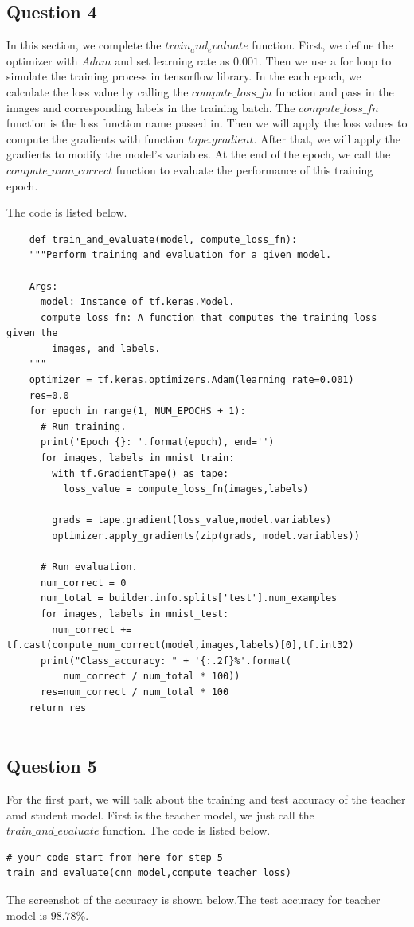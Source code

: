 \documentclass[conference]{IEEEtran}
\begin{document}
\subsection{Question 4}
In this section, we complete the $train_and_evaluate$ function.
First, we define the optimizer with $Adam$ and set learning rate as $0.001$.
Then we use a for loop to simulate the training process in tensorflow library.
In the each epoch, we calculate the loss value by calling the $compute\_loss\_fn$ function and pass in the images and corresponding labels in the training batch.
The $compute\_loss\_fn$ function is the loss function name passed in.
Then we will apply the loss values to compute the gradients with function $tape.gradient$. 
After that, we will apply the gradients to modify the model's variables.
At the end of the epoch, we call the $compute\_num\_correct$ function to evaluate the performance of this training epoch.\par
The code is listed below.
\begin{lstlisting}
    def train_and_evaluate(model, compute_loss_fn):
    """Perform training and evaluation for a given model.
  
    Args:
      model: Instance of tf.keras.Model.
      compute_loss_fn: A function that computes the training loss given the
        images, and labels.
    """
    optimizer = tf.keras.optimizers.Adam(learning_rate=0.001)
    res=0.0
    for epoch in range(1, NUM_EPOCHS + 1):
      # Run training.
      print('Epoch {}: '.format(epoch), end='')
      for images, labels in mnist_train:
        with tf.GradientTape() as tape:
          loss_value = compute_loss_fn(images,labels)
  
        grads = tape.gradient(loss_value,model.variables)
        optimizer.apply_gradients(zip(grads, model.variables))
  
      # Run evaluation.
      num_correct = 0
      num_total = builder.info.splits['test'].num_examples
      for images, labels in mnist_test:
        num_correct += tf.cast(compute_num_correct(model,images,labels)[0],tf.int32)
      print("Class_accuracy: " + '{:.2f}%'.format(
          num_correct / num_total * 100))
      res=num_correct / num_total * 100
    return res
      
\end{lstlisting}
\subsection{Question 5}
For the first part, we will talk about the training and test accuracy of the teacher amd student model.
First is the teacher model, we just call the $train\_and\_evaluate$ function. The code is listed below.
\begin{lstlisting}
# your code start from here for step 5 
train_and_evaluate(cnn_model,compute_teacher_loss)
\end{lstlisting}
The screenshot of the accuracy is shown below.The test accuracy for teacher model is $98.78\%$.
\end{document}
